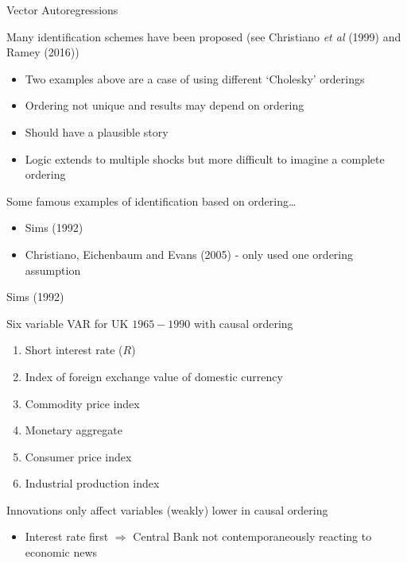 \begin{frame}{Vector Autoregressions}

Many identification schemes have been proposed (see Christiano \emph{et al} (1999) and Ramey (2016))
	\begin{itemize}
	\item	Two examples above are a case of using different `Cholesky' orderings
	\item	Ordering not unique and results may depend on ordering
	\item	Should have a plausible story
	\item	Logic extends to multiple shocks but more difficult to imagine a complete ordering
	\end{itemize}
Some famous examples of identification based on ordering\ldots
\begin{itemize}
\item	Sims (1992)
\item	Christiano, Eichenbaum and Evans (2005) - only used one ordering assumption
\end{itemize}

\end{frame}


\begin{frame}{Sims (1992)}

Six variable VAR for UK $1965-1990$ with causal ordering
	\begin{enumerate}
	\item Short interest rate ($R$)
	\item Index of foreign exchange value of domestic currency
	\item Commodity price index
	\item Monetary aggregate
	\item Consumer price index
	\item Industrial production index
	\end{enumerate}

\vspace{2mm}
Innovations only affect variables (weakly) lower in causal ordering
	\begin{itemize}
	\item	Interest rate first $\Rightarrow$ Central Bank not contemporaneously reacting to economic news
	\end{itemize}

\end{frame}

